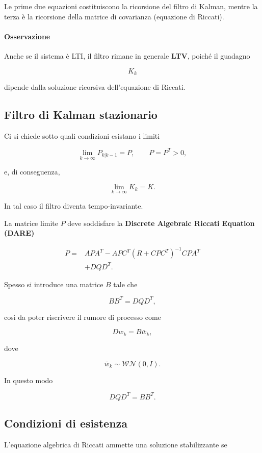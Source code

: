 \documentclass[11pt,a4paper]{article}
\begin{document}
Le prime due equazioni costituiscono la ricorsione del filtro di Kalman, mentre la terza è la ricorsione della matrice di covarianza (equazione di Riccati).

\paragraph{Osservazione}

Anche se il sistema è LTI, il filtro rimane in generale \textbf{LTV}, poiché il guadagno

\[
K_k
\]

dipende dalla soluzione ricorsiva dell'equazione di Riccati.

\subsection*{Filtro di Kalman stazionario}

Ci si chiede sotto quali condizioni esistano i limiti

\[
\lim_{k\rightarrow\infty}
P_{k|k-1}
=
P,
\qquad
P=P^T>0,
\]

e, di conseguenza,

\[
\lim_{k\rightarrow\infty}
K_k
=
K.
\]

In tal caso il filtro diventa tempo-invariante.

La matrice limite \(P\) deve soddisfare la \textbf{Discrete Algebraic Riccati Equation (DARE)}

\[
\boxed{
\begin{aligned}
P
=
&
APA^T
-
APC^T
\left(
R+CPC^T
\right)^{-1}
CPA^T
\\
&
+
DQD^T.
\end{aligned}
}
\]

Spesso si introduce una matrice \(B\) tale che

\[
\boxed{
BB^T=DQD^T,
}
\]

così da poter riscrivere il rumore di processo come

\[
Dw_k=B\bar{w}_k,
\]

dove

\[
\bar{w}_k
\sim
\mathcal{WN}(0,I).
\]

In questo modo

\[
DQD^T
=
BB^T.
\]

\subsection*{Condizioni di esistenza}

L'equazione algebrica di Riccati ammette una soluzione stabilizzante se
\end{document}
